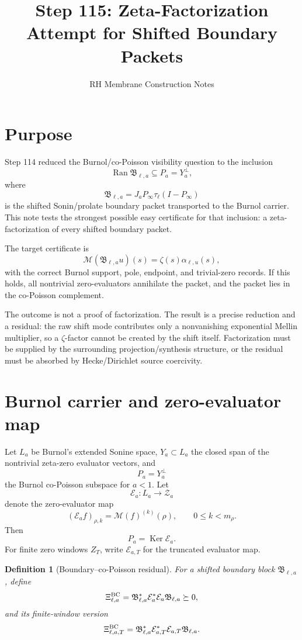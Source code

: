 \documentclass[11pt]{article}
\title{Step 115: Zeta-Factorization Attempt for Shifted Boundary Packets}
\author{RH Membrane Construction Notes}
\date{}
\newtheorem{definition}{Definition}
\newcommand{\E}{\mathcal E}
\newcommand{\M}{\mathcal M}
\newcommand{\Ran}{\operatorname{Ran}}
\newcommand{\Ker}{\operatorname{Ker}}
\begin{document}
\maketitle

\section{Purpose}
Step 114 reduced the Burnol/co-Poisson visibility question to the inclusion
\[
  \Ran \mathfrak B_{\ell,a}\subseteq P_a=Y_a^\perp,
\]
where
\[
  \mathfrak B_{\ell,a}=J_aP_\infty\tau_\ell(I-P_\infty)
\]
is the shifted Sonin/prolate boundary packet transported to the Burnol carrier.  This note tests the strongest possible easy certificate for that inclusion: a zeta-factorization of every shifted boundary packet.

The target certificate is
\[
  \M(\mathfrak B_{\ell,a}u)(s)=\zeta(s)\alpha_{\ell,u}(s),
\]
with the correct Burnol support, pole, endpoint, and trivial-zero records.  If this holds, all nontrivial zero-evaluators annihilate the packet, and the packet lies in the co-Poisson complement.

The outcome is not a proof of factorization.  The result is a precise reduction and a residual: the raw shift mode contributes only a nonvanishing exponential Mellin multiplier, so a \(\zeta\)-factor cannot be created by the shift itself.  Factorization must be supplied by the surrounding projection/synthesis structure, or the residual must be absorbed by Hecke/Dirichlet source coercivity.

\section{Burnol carrier and zero-evaluator map}
Let \(L_a\) be Burnol's extended Sonine space, \(Y_a\subset L_a\) the closed span of the nontrivial zeta-zero evaluator vectors, and
\[
  P_a=Y_a^\perp
\]
the Burnol co-Poisson subspace for \(a<1\).  Let
\[
  \E_a:L_a\longrightarrow \mathcal Z_a
\]
denote the zero-evaluator map
\[
  (\E_af)_{\rho,k}=\M(f)^{(k)}(\rho),
  \qquad 0\le k<m_\rho.
\]
Then
\[
  P_a=\Ker \E_a.
\]
For finite zero windows \(Z_T\), write \(\E_{a,T}\) for the truncated evaluator map.

\begin{definition}[Boundary--co-Poisson residual]
For a shifted boundary block \(\mathfrak B_{\ell,a}\), define
\[
  \Xi^{\rm BC}_{\ell,a}=\mathfrak B_{\ell,a}^*\E_a^*\E_a\mathfrak B_{\ell,a}\succeq0,
\]
and its finite-window version
\[
  \Xi^{\rm BC}_{\ell,a,T}=\mathfrak B_{\ell,a}^*\E_{a,T}^*\E_{a,T}\mathfrak B_{\ell,a}.
\]
\end{definition}
\end{document}
